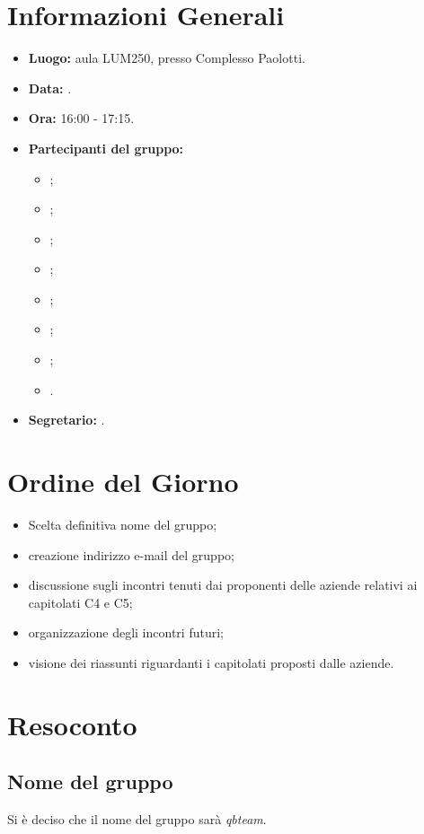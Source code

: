\section{Informazioni Generali}
\begin{itemize}
\item \textbf{Luogo:} aula LUM250, presso Complesso Paolotti.
\item \textbf{Data:} \Data.
\item \textbf{Ora:} 16:00 - 17:15.
\item \textbf{Partecipanti del gruppo:}
	\begin{itemize}
		\item \AT; 
		\item \BR;
		\item \CE; 
		\item \DF;
		\item \LD;
		\item \MC;
		\item \PF;
		\item \SE.
	\end{itemize} 
\item \textbf{Segretario:} \BR.
\end{itemize}


\section{Ordine del Giorno}
\begin{itemize}
	\item Scelta definitiva nome del gruppo;
	\item creazione indirizzo e-mail del gruppo;
	\item discussione sugli incontri tenuti dai proponenti delle aziende relativi ai capitolati C4 e C5;
	\item organizzazione degli incontri futuri;
	\item visione dei riassunti riguardanti i capitolati proposti dalle aziende.
\end{itemize}


\section{Resoconto}
\subsection{Nome del gruppo}
Si è deciso che il nome del gruppo sarà \textit{qbteam}.

